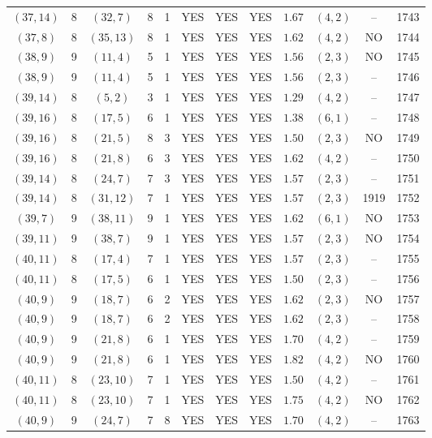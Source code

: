 \begin{longtable}{|c|c|c|c|c|c|c|c|c|c|c|c|}
$(37,14)$ & 8 & $(32,7)$ & 8 & 1 & YES & YES & YES & $1.67$ & $(4,2)$ & -- & 1743\\
$(37,8)$ & 8 & $(35,13)$ & 8 & 1 & YES & YES & YES & $1.62$ & $(4,2)$ & NO & 1744\\
$(38,9)$ & 9 & $(11,4)$ & 5 & 1 & YES & YES & YES & $1.56$ & $(2,3)$ & NO & 1745\\
$(38,9)$ & 9 & $(11,4)$ & 5 & 1 & YES & YES & YES & $1.56$ & $(2,3)$ & -- & 1746\\
$(39,14)$ & 8 & $(5,2)$ & 3 & 1 & YES & YES & YES & $1.29$ & $(4,2)$ & -- & 1747\\
$(39,16)$ & 8 & $(17,5)$ & 6 & 1 & YES & YES & YES & $1.38$ & $(6,1)$ & -- & 1748\\
$(39,16)$ & 8 & $(21,5)$ & 8 & 3 & YES & YES & YES & $1.50$ & $(2,3)$ & NO & 1749\\
$(39,16)$ & 8 & $(21,8)$ & 6 & 3 & YES & YES & YES & $1.62$ & $(4,2)$ & -- & 1750\\
$(39,14)$ & 8 & $(24,7)$ & 7 & 3 & YES & YES & YES & $1.57$ & $(2,3)$ & -- & 1751\\
$(39,14)$ & 8 & $(31,12)$ & 7 & 1 & YES & YES & YES & $1.57$ & $(2,3)$ & 1919 & 1752\\
$(39,7)$ & 9 & $(38,11)$ & 9 & 1 & YES & YES & YES & $1.62$ & $(6,1)$ & NO & 1753\\
$(39,11)$ & 9 & $(38,7)$ & 9 & 1 & YES & YES & YES & $1.57$ & $(2,3)$ & NO & 1754\\
$(40,11)$ & 8 & $(17,4)$ & 7 & 1 & YES & YES & YES & $1.57$ & $(2,3)$ & -- & 1755\\
$(40,11)$ & 8 & $(17,5)$ & 6 & 1 & YES & YES & YES & $1.50$ & $(2,3)$ & -- & 1756\\
$(40,9)$ & 9 & $(18,7)$ & 6 & 2 & YES & YES & YES & $1.62$ & $(2,3)$ & NO & 1757\\
$(40,9)$ & 9 & $(18,7)$ & 6 & 2 & YES & YES & YES & $1.62$ & $(2,3)$ & -- & 1758\\
$(40,9)$ & 9 & $(21,8)$ & 6 & 1 & YES & YES & YES & $1.70$ & $(4,2)$ & -- & 1759\\
$(40,9)$ & 9 & $(21,8)$ & 6 & 1 & YES & YES & YES & $1.82$ & $(4,2)$ & NO & 1760\\
$(40,11)$ & 8 & $(23,10)$ & 7 & 1 & YES & YES & YES & $1.50$ & $(4,2)$ & -- & 1761\\
$(40,11)$ & 8 & $(23,10)$ & 7 & 1 & YES & YES & YES & $1.75$ & $(4,2)$ & NO & 1762\\
$(40,9)$ & 9 & $(24,7)$ & 7 & 8 & YES & YES & YES & $1.70$ & $(4,2)$ & -- & 1763\\

\end{longtable}
